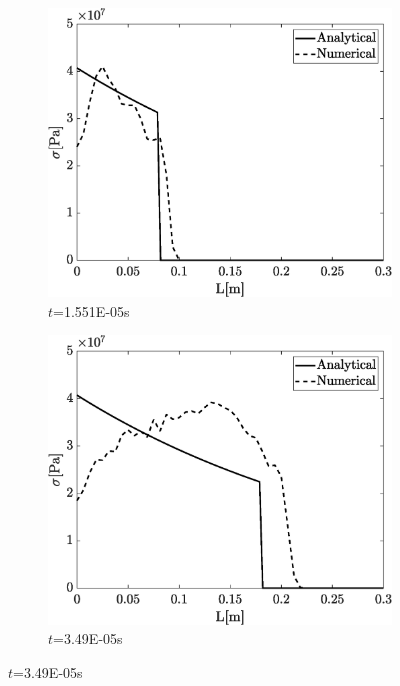 \documentclass{article}
\begin{document}
\begin{figure}[ht]
        \begin{subfigure}{0.5\textwidth}
            \includegraphics[width=1\linewidth, height=0.8\linewidth]{figures/stress_t1.eps} 
            \caption{$t$=1.551E-05s}
            \label{fig:sigma_t1}
        \end{subfigure}
        \begin{subfigure}{0.5\textwidth}
            \includegraphics[width=1\linewidth, height=0.8\linewidth]{figures/stress_t2.eps} 
            \caption{$t$=3.49E-05s}
            \label{fig:sigma_t2}
        \end{subfigure}

\end{figure}
\end{document}
